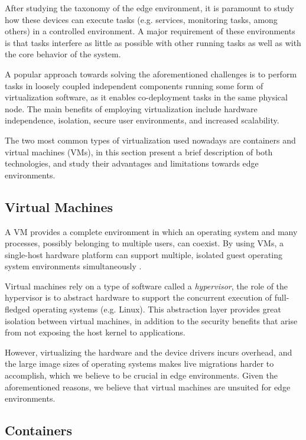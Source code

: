 
After studying the taxonomy of the edge environment, it is paramount to study how these devices can execute tasks (e.g. services, monitoring tasks, among others) in a controlled environment. A major requirement of these environments is that tasks interfere as little as possible with other running tasks as well as with the core behavior of the system.

A popular approach towards solving the aforementioned challenges is to perform tasks in loosely coupled independent components running some form of virtualization software, as it enables co-deployment tasks in the same physical node. The main benefits of employing virtualization include hardware independence, isolation, secure user environments, and increased scalability. 

The two most common types of virtualization used nowadays are containers and virtual machines (VMs), in this section present a brief description of both technologies, and study their advantages and limitations towards edge environments.

\subsection{Virtual Machines}

A VM provides a complete environment in which an operating system and many processes, possibly belonging to multiple users, can coexist. By using VMs, a single-host hardware platform can support multiple, isolated guest operating system environments simultaneously \cite{1430629}. 

Virtual machines rely on a type of software called a \textit{hypervisor}, the role of the hypervisor is to abstract hardware to support the concurrent execution of full-fledged operating systems (e.g. Linux). This abstraction layer provides great isolation between virtual machines, in addition to the security benefits that arise from not exposing the host kernel to applications. 

However, virtualizing the hardware and the device drivers incurs overhead, and the large image sizes of operating systems makes live migrations harder to accomplish, which we believe to be crucial in edge environments. Given the aforementioned reasons, we believe that virtual machines are unsuited for edge environments.

\subsection{Containers}

